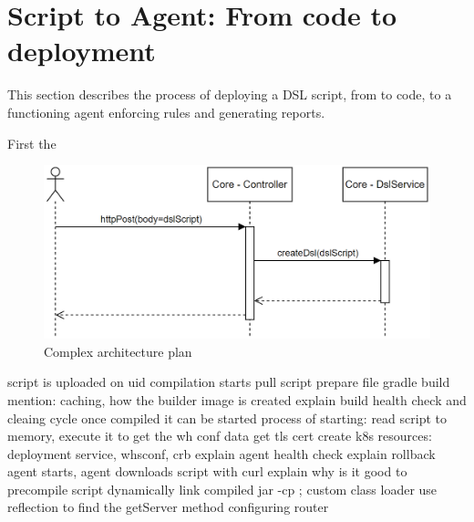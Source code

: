 \section[Script to Agent]{Script to Agent: From code to deployment}

This section describes the process of deploying a DSL script, from to code, to a functioning agent enforcing rules and generating reports.

First the 

\begin{figure}[h]
    \centering
    \includegraphics[width=130mm, keepaspectratio]{seq0.png}
    \caption{Complex architecture plan}
    \label{fig:comp_arch}
\end{figure}

script is uploaded on uid
compilation starts
    pull script
    prepare file
    gradle build
    mention: caching, how the builder image is created
    explain build health check and cleaing cycle
once compiled it can be started
process of starting:    
    read script to memory, execute it to get the wh conf data
    get tls cert
    create k8s resources: deployment service, whsconf, crb
    explain agent health check
    explain rollback
agent starts, agent downloads script with curl
    explain why is it good to precompile script
    dynamically link compiled jar -cp ; custom class loader
    use reflection to find the getServer method
    configuring router